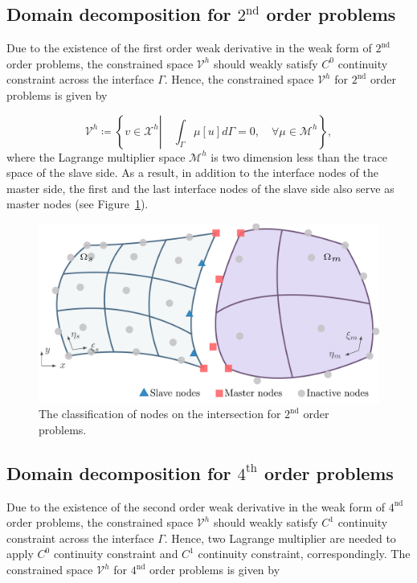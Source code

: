 \subsection{Domain decomposition for $2^\text{nd}$ order problems}

Due to the existence of the first order weak derivative in the weak form of $2^\text{nd}$ order problems, the constrained space $\mathcal{V}^h$ should weakly satisfy $C^0$ continuity constraint across the interface $\Gamma$. Hence, the constrained space $\mathcal{V}^h$ for $2^\text{nd}$ order problems is given by

\begin{equation}
	\mathcal{V}^h\coloneqq \left\{ v\in \mathcal{X}^h \left|\quad \int_{\Gamma} \mu \left[ u \right] d \Gamma=0,\quad \forall \mu\in \mathcal{M}^h \right. \right\},
\end{equation}
where the Lagrange multiplier space $\mathcal{M}^h$ is two dimension less than the trace space of the slave side. As a result, in addition to the interface nodes of the master side, the first and the last interface nodes of the slave side also serve as master nodes (see Figure~\ref{fig:2nd_order_nodes}). 
\begin{figure}[ht]
	\center
	\includegraphics[width=.7\columnwidth]{two_patch_domain_poisson}
	\caption{The classification of nodes on the intersection for $2^\text{nd}$ order problems. }\label{fig:2nd_order_nodes}
\end{figure}

\subsection{Domain decomposition for $4^\text{th}$ order problems}

Due to the existence of the second order weak derivative in the weak form of $4^\text{nd}$ order problems, the constrained space $\mathcal{V}^h$ should weakly satisfy $C^1$ continuity constraint across the interface $\Gamma$. Hence, two Lagrange multiplier are needed to apply $C^0$ continuity constraint and $C^1$ continuity constraint, correspondingly. The constrained space $\mathcal{V}^h$ for $4^\text{nd}$ order problems is given by


